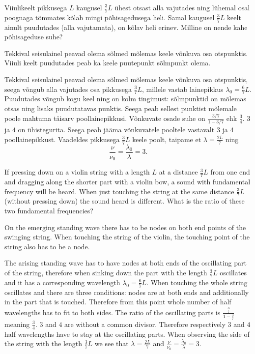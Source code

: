 
Viiulikeelt pikkusega $L$ kaugusel $\frac{3}{7}L$ ühest otsast alla vajutades ning lühemal osal poognaga tõmmates kõlab mingi põhisagedusega heli. Samal kaugusel $\frac{3}{7}L$ keelt ainult puudutades (alla vajutamata), on kõlav heli erinev. Milline on nende kahe põhisageduse suhe?

\hint
Tekkival seisulainel peavad olema sõlmed mõlemas keele võnkuva osa otspunktis. Viiuli keelt puudutades peab ka keele puutepunkt sõlmpunkt olema.

\solu
Tekkival seisulainel peavad olema sõlmed mõlemas keele võnkuva osa otspunktis, seega võngub alla vajutades osa pikkusega $\frac{3}{7}L$, millele vastab lainepikkus $\lambda_0=\frac{6}{7}L$. Puudutades võngub kogu keel ning on kolm tingimust: sõlmpunktid on mõlemas otsas ning lisaks puudutatavas punktis. Seega peab sellest punktist mõlemale poole mahtuma täisarv poollainepikkusi. Võnkuvate osade suhe on $\frac{3/7}{1-3/7}$ ehk $\frac{3}{4}$. $3$ ja $4$ on ühistegurita. Seega peab jääma võnkuvatele pooltele vastavalt $3$ ja $4$ poollainepikkust. Vaadeldes pikkusega $\frac{3}{7}L$ keele poolt, taipame et $\lambda=\frac{2L}{7}$ ning
\[
\frac{\nu}{\nu_0}=\frac{\lambda_0}{\lambda}=3.
\]

If pressing down on a violin string with a length $L$ at a distance $\frac{3}{7}L$ from one end and dragging along the shorter part with a violin bow, a sound with fundamental frequency will be heard. When just touching the string at the same distance $\frac{3}{7}L$ (without pressing down) the sound heard is different. What is the ratio of these two fundamental frequencies?

\hinteng
On the emerging standing wave there has to be nodes on both end points of the swinging string. When touching the string of the violin, the touching point of the string also has to be a node.

\solueng
The arising standing wave has to have nodes at both ends of the oscillating part of the string, therefore when sinking down the part with the length $\frac{3}{7}L$ oscillates and it has a corresponding wavelength $\lambda_0=\frac{6}{7}L$. When touching the whole string oscillates and there are three conditions: nodes are at both ends and additionally in the part that is touched. Therefore from this point whole number of half wavelengths has to fit to both sides. The ratio of the oscillating parts is $\frac{\frac{3}{7}}{1-\frac{3}{7}}$ meaning $\frac{3}{4}$. $3$ and $4$ are without a common divisor. Therefore respectively $3$ and $4$ half wavelengths have to stay at the oscillating parts. When observing the side of the string with the length $\frac{3}{7}L$ we see that $\lambda=\frac{2L}{7}$ and $\frac{\nu}{\nu_0}=\frac{\lambda_0}{\lambda}=3$.
\probend